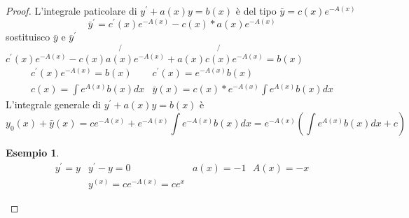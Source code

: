 \documentclass{book}
\newtheorem{esempio}{Esempio}
\begin{document}
\begin{proof}
	L'integrale paticolare di $y^\prime+a(x)y=b(x)$ è del tipo
	$\bar{y}=c(x)e^{-A(x)}$
	\begin{equation*}
		\bar{y}^\prime=c^\prime(x)e^{-A(x)}-c(x)*a(x)e^{-A(x)}
	\end{equation*}
	sostituisco $\bar{y}$ e $\bar{y}^\prime$ $c^\prime(x)e^{-A(x)}-
	\not{c(x)a(x)e^{-A(x)}}+\not{a(x)c(x)e^{-A(x)}}=b(x)$
	\begin{eqnarray*}
		c^\prime(x)e^{-A(x)}=b(x) & c^\prime(x)=e^{-A(x)}b(x)\\
		c(x)=\int e^{A(x)}b(x)dx & \bar{y}(x)=c(x)*e^{-A(x)}\int e^{A(x)}b(x)dx
	\end{eqnarray*}
	L'integrale generale di $y^\prime+a(x)y=b(x)$ è
	\begin{equation*}
		y_0(x)+\bar{y}(x)=ce^{-A(x)}+e^{-A(x)}\int
		e^{-A(x)}b(x)dx=e^{-A(x)}\left(\int e^{A(x)}b(x)dx+c\right)
	\end{equation*}
	\begin{esempio}
		\begin{eqnarray*}
			y^\prime =y &y^\prime-y=0 & a(x)=-1\text{ }A(x)=-x\\
			&y^{(x)}=ce^{-A(x)}=ce^x
		\end{eqnarray*}
	\end{esempio}
\end{proof}
\end{document}
